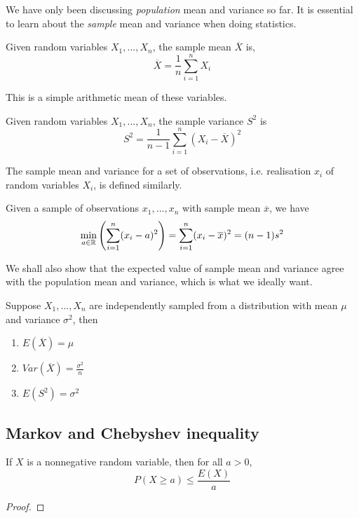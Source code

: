 \documentclass[11pt]{article}
\begin{document}
We have only been discussing \emph{population} mean and variance so far. It is essential to learn about the \emph{sample} mean and variance when doing statistics.
\begin{definition}
  Given random variables \(X_1,...,X_n\), the sample mean \(\overline{X}\) is,
  \[\overline{X}=\frac{1}{n}\sum_{i=1}^{n}X_i\]
\end{definition}
This is a simple arithmetic mean of these variables.
\begin{definition}
  Given random variables \(X_1,...,X_n\), the sample variance \(S^2\) is
  \[S^2=\frac{1}{n-1}\sum_{i=1}^{n}(X_i-\overline{X})^2\]
\end{definition}

The sample mean and variance for a set of observations, i.e. realisation \(x_i\) of random variables \(X_i\), is defined similarly.

\begin{proposition}
  Given a sample of observations \(x_1,...,x_n\) with sample mean \(\overline{x}\), we have 
  \[\min_{a\in\mathbb{R}}\left(\sum_{i=1}^{n}(x_i-a)^2\right)=\sum_{i=1}^{n}(x_i-\overline{x})^2=(n-1)s^2\]
\end{proposition}

We shall also show that the expected value of sample mean and variance agree with the population mean and variance, which is what we ideally want.
\begin{proposition}
  Suppose \(X_1,...,X_n\) are independently sampled from a distribution with mean \(\mu\) and variance \(\sigma^2\), then
  \begin{enumerate}
    \item \(E(\overline{X})=\mu\)
    \item \(Var(\overline{X})=\frac{\sigma^2}{n}\)
    \item \(E(S^2)=\sigma^2\)
  \end{enumerate}
\end{proposition}

\subsection{Markov and Chebyshev inequality}
\begin{theorem}
  If \(X\) is a nonnegative random variable, then for all \(a>0\),
  \[P(X\geq a)\leq\frac{E(X)}{a}\] 
\end{theorem}
\begin{proof}
  
\end{proof}
\end{document}
